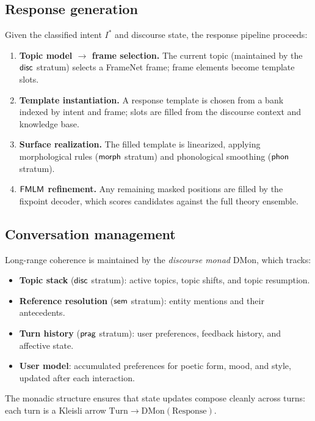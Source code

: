 \subsection{Response generation}
\label{ssec:response-gen}

Given the classified intent $I^*$ and discourse state, the response
pipeline proceeds:
\begin{enumerate}
  \item \textbf{Topic model $\to$ frame selection.}\;
        The current topic (maintained by the $\mathsf{disc}$ stratum) selects
        a FrameNet frame; frame elements become template slots.
  \item \textbf{Template instantiation.}\;
        A response template is chosen from a bank indexed by intent
        and frame; slots are filled from the discourse context and
        knowledge base.
  \item \textbf{Surface realization.}\;
        The filled template is linearized, applying morphological
        rules ($\mathsf{morph}$ stratum) and phonological smoothing ($\mathsf{phon}$
        stratum).
  \item \textbf{$\mathsf{FMLM}$ refinement.}\;
        Any remaining masked positions are filled by the fixpoint
        decoder, which scores candidates against the full theory
        ensemble.
\end{enumerate}

\subsection{Conversation management}
\label{ssec:conversation}

Long-range coherence is maintained by the \emph{discourse monad}
$\mathrm{DMon}$, which tracks:
\begin{itemize}
  \item \textbf{Topic stack}\; ($\mathsf{disc}$ stratum): active topics,
        topic shifts, and topic resumption.
  \item \textbf{Reference resolution}\; ($\mathsf{sem}$ stratum): entity
        mentions and their antecedents.
  \item \textbf{Turn history}\; ($\mathsf{prag}$ stratum): user preferences,
        feedback history, and affective state.
  \item \textbf{User model}: accumulated preferences for poetic form,
        mood, and style, updated after each interaction.
\end{itemize}

The monadic structure ensures that state updates compose cleanly
across turns: each turn is a Kleisli arrow
$\mathrm{Turn} \to \mathrm{DMon}(\mathrm{Response})$.

